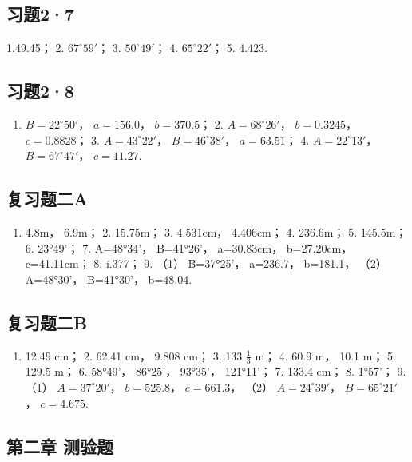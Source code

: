 \subsection{习题2·7}

1.49.45； 2. \(67^{\circ}59'\)； 3. \(50^{\circ}49'\)； 4.
\(65^{\circ}22'\)； 5. 4.423.

\subsection{习题2·8}

\begin{enumerate}
\item
  \(B = 22^{\circ}50'\)， \(a = 156.0\)， \(b = 370.5\)； 2.
  \(A = 68^{\circ}26'\)， \(b = 0.3245\)， \(c = 0.8828\)； 3.
  \(A = 43^{\circ}22'\)， \(B = 46^{\circ}38'\)， \(a = 63.51\)； 4.
  \(A = 22^{\circ}13'\)， \(B = 67^{\circ}47'\)， \(c = 11.27\).
\end{enumerate}

\subsection{复习题二A}

\begin{enumerate}
\item
  4.8m， 6.9m； 2. 15.75m； 3. 4.531cm， 4.406cm； 4. 236.6m； 5.
  145.5m； 6. 23°49'； 7. A=48°34'， B=41°26'， a=30.83cm， b=27.20cm，
  c=41.11cm； 8. i.377； 9. （1） B=37°25'， a=236.7， b=181.1， （2）
  A=48°30'， B=41°30'， b=48.04.
\end{enumerate}

\subsection{复习题二B}

\begin{enumerate}
\item
  12.49 cm； 2. 62.41 cm， 9.808 cm； 3. 133 \(\frac{1}{3}\) m； 4. 60.9
  m， 10.1 m； 5. 129.5 m； 6. 58°49'， 86°25'， 93°35'， 121°11'； 7.
  133.4 cm； 8. 1°57'； 9. （1） \(A = 37^{\circ}20'\)， \(b = 525.8\)，
  \(c = 661.3\)， （2） \(A = 24^{\circ}39'\)， \(B = 65^{\circ}21'\)，
  \(c = 4.675\).
\end{enumerate}

\subsection{第二章 测验题}

